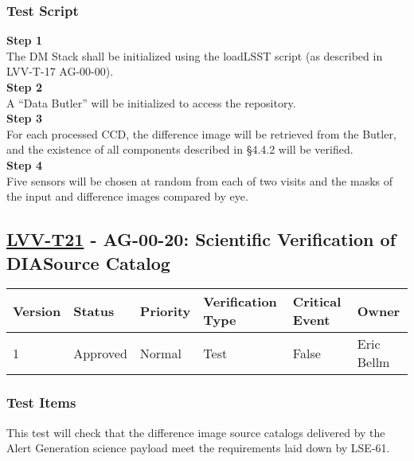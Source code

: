\subsubsection{Test Script}\label{test-script-3}

\textbf{Step 1}\\
The DM Stack shall be initialized using the loadLSST script (as
described in LVV-T-17 AG-00-00).\\[2\baselineskip]\textbf{Step 2}\\
A ``Data Butler'' will be initialized to access the
repository.\\[2\baselineskip]\textbf{Step 3}\\
For each processed CCD, the difference image will be retrieved from the
Butler, and the existence of all components described in §4.4.2 will be
verified.\\[2\baselineskip]\textbf{Step 4}\\
Five sensors will be chosen at random from each of two visits and the
masks of the input and difference images compared by
eye.\\[2\baselineskip]

\hypertarget{lvv-t21---ag-00-20-scientific-verification-of-diasource-catalog}{\subsection{\texorpdfstring{\href{https://jira.lsstcorp.org/secure/Tests.jspa\#/testCase/LVV-T21}{LVV-T21}
- AG-00-20: Scientific Verification of DIASource
Catalog}{LVV-T21 - AG-00-20: Scientific Verification of DIASource Catalog}}\label{lvv-t21---ag-00-20-scientific-verification-of-diasource-catalog}}

\begin{longtable}[]{@{}llllll@{}}
\toprule
Version & Status & Priority & Verification Type & Critical Event &
Owner\tabularnewline
\midrule
\endhead
1 & Approved & Normal & Test & False & Eric Bellm\tabularnewline
\bottomrule
\end{longtable}

\subsubsection{Test Items}\label{test-items-4}

This test will check that the difference image source catalogs delivered
by the Alert Generation science payload meet the requirements laid down
by LSE-61.

